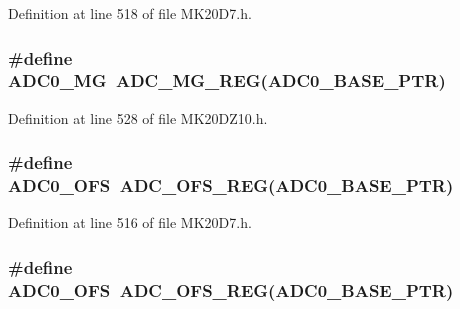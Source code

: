 Definition at line 518 of file M\+K20\+D7.\+h.

\subsubsection[{\texorpdfstring{A\+D\+C0\+\_\+\+MG}{ADC0_MG}}]{\setlength{\rightskip}{0pt plus 5cm}\#define A\+D\+C0\+\_\+\+MG~{\bf A\+D\+C\+\_\+\+M\+G\+\_\+\+R\+EG}({\bf A\+D\+C0\+\_\+\+B\+A\+S\+E\+\_\+\+P\+TR})}\hypertarget{group___a_d_c___register___accessor___macros_gac3baf0b5cfa0509588527436dc8bf209}{}\label{group___a_d_c___register___accessor___macros_gac3baf0b5cfa0509588527436dc8bf209}


Definition at line 528 of file M\+K20\+D\+Z10.\+h.

\subsubsection[{\texorpdfstring{A\+D\+C0\+\_\+\+O\+FS}{ADC0_OFS}}]{\setlength{\rightskip}{0pt plus 5cm}\#define A\+D\+C0\+\_\+\+O\+FS~{\bf A\+D\+C\+\_\+\+O\+F\+S\+\_\+\+R\+EG}({\bf A\+D\+C0\+\_\+\+B\+A\+S\+E\+\_\+\+P\+TR})}\hypertarget{group___a_d_c___register___accessor___macros_gafc3e937b7e7ee72630397b81944464b5}{}\label{group___a_d_c___register___accessor___macros_gafc3e937b7e7ee72630397b81944464b5}


Definition at line 516 of file M\+K20\+D7.\+h.

\subsubsection[{\texorpdfstring{A\+D\+C0\+\_\+\+O\+FS}{ADC0_OFS}}]{\setlength{\rightskip}{0pt plus 5cm}\#define A\+D\+C0\+\_\+\+O\+FS~{\bf A\+D\+C\+\_\+\+O\+F\+S\+\_\+\+R\+EG}({\bf A\+D\+C0\+\_\+\+B\+A\+S\+E\+\_\+\+P\+TR})}\hypertarget{group___a_d_c___register___accessor___macros_gafc3e937b7e7ee72630397b81944464b5}{}\label{group___a_d_c___register___accessor___macros_gafc3e937b7e7ee72630397b81944464b5}



